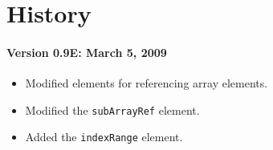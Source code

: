 \section*{History}

\paragraph*{Version 0.9E: March 5, 2009}
\begin{itemize}
\item Modified elements for referencing array elements.
\item Modified the {\tt subArrayRef} element.
\item Added the {\tt indexRange} element.
\end{itemize}


